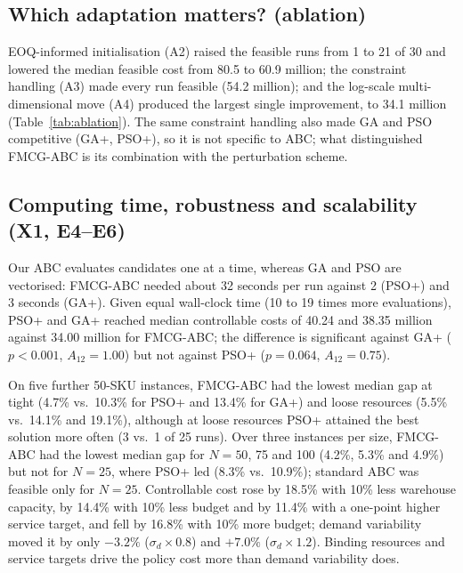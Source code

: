 

\subsection{Which adaptation matters? (ablation)}\label{sec:res-ablation}
EOQ-informed initialisation (A2) raised the feasible runs from 1 to 21 of 30 and lowered the median feasible cost from 80.5 to 60.9 million; the constraint handling (A3) made every run feasible (54.2 million); and the log-scale multi-dimensional move (A4) produced the largest single improvement, to 34.1 million (Table~\ref{tab:ablation}). The same constraint handling also made GA and PSO competitive (GA+, PSO+), so it is not specific to ABC; what distinguished FMCG-ABC is its combination with the perturbation scheme.



\subsection{Computing time, robustness and scalability (X1, E4--E6)}\label{sec:res-robust}
Our ABC evaluates candidates one at a time, whereas GA and PSO are vectorised: FMCG-ABC needed about 32 seconds per run against 2 (PSO+) and 3 seconds (GA+). Given equal wall-clock time (10 to 19 times more evaluations), PSO+ and GA+ reached median controllable costs of 40.24 and 38.35 million against 34.00 million for FMCG-ABC; the difference is significant against GA+ ($p<0.001$, $A_{12}=1.00$) but not against PSO+ ($p=0.064$, $A_{12}=0.75$).

On five further 50-SKU instances, FMCG-ABC had the lowest median gap at tight (4.7\% vs.\ 10.3\% for PSO+ and 13.4\% for GA+) and loose resources (5.5\% vs.\ 14.1\% and 19.1\%), although at loose resources PSO+ attained the best solution more often (3 vs.\ 1 of 25 runs). Over three instances per size, FMCG-ABC had the lowest median gap for $N=50$, 75 and 100 (4.2\%, 5.3\% and 4.9\%) but not for $N=25$, where PSO+ led (8.3\% vs.\ 10.9\%); standard ABC was feasible only for $N=25$. Controllable cost rose by 18.5\% with 10\% less warehouse capacity, by 14.4\% with 10\% less budget and by 11.4\% with a one-point higher service target, and fell by 16.8\% with 10\% more budget; demand variability moved it by only $-3.2\%$ ($\sigma_d\times0.8$) and $+7.0\%$ ($\sigma_d\times1.2$). Binding resources and service targets drive the policy cost more than demand variability does.

